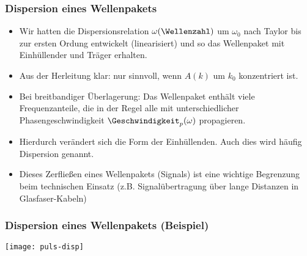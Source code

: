  \begin{frame}
  \frametitle{Dispersion eines Wellenpakets}
      \begin{itemize}[<+->]
      \item Wir hatten die Dispersionsrelation \(\omega(\Wellenzahl)\) um \(\omega_0\) nach Taylor bis zur ersten Ordung entwickelt (\alert{linearisiert}) und so das Wellenpaket mit Einhüllender und Träger erhalten.
        \item Aus der Herleitung klar: nur sinnvoll, wenn \(A(k)\) um \(k_0\) \alert{konzentriert} ist.
        \item Bei breitbandiger Überlagerung: Das Wellenpaket enthält viele Frequenzanteile, die in der Regel alle mit \alert{unterschiedlicher Phasengeschwindigkeit} \(\Geschwindigkeit_p(\omega)\) propagieren.
        \item Hierdurch verändert sich die Form der Einhüllenden. Auch dies wird häufig \alert{Dispersion} genannt.
          \item Dieses \alert{Zerfließen} eines Wellenpakets (Signals) ist eine wichtige Begrenzung beim technischen Einsatz (z.B. Signalübertragung über lange Distanzen in Glasfaser-Kabeln)
 \end{itemize}
  \end{frame}

 \begin{frame}
   \frametitle{Dispersion eines Wellenpakets (Beispiel)}
   \centering
   \texttt{[image: puls-disp]}
  \end{frame}



   
